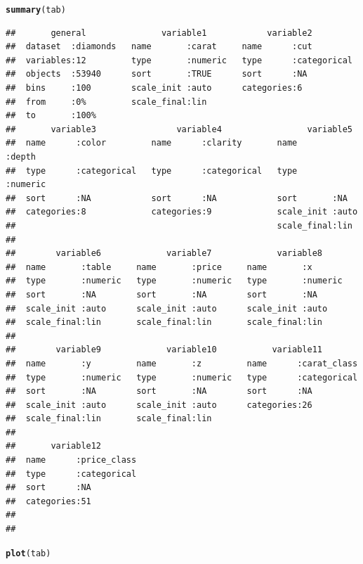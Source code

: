 \documentclass[11pt, fleqn, a4paper]{article}\usepackage{graphicx, color}
\makeatletter
\newcommand{\hlfunctioncall}[1]{\textcolor[rgb]{0.501960784313725,0,0.329411764705882}{\textbf{#1}}}%
\newenvironment{kframe}{%
 \def\at@end@of@kframe{}%
 \ifinner\ifhmode%
  \def\at@end@of@kframe{\end{minipage}}%
  \begin{minipage}{\columnwidth}%
 \fi\fi%
 \def\FrameCommand##1{\hskip\@totalleftmargin \hskip-\fboxsep
 \colorbox{shadecolor}{##1}\hskip-\fboxsep
     \hskip-\linewidth \hskip-\@totalleftmargin \hskip\columnwidth}%
 \MakeFramed {\advance\hsize-\width
   \@totalleftmargin\z@ \linewidth\hsize
   \@setminipage}}%
 {\par\unskip\endMakeFramed%
 \at@end@of@kframe}
\newenvironment{knitrout}{}{} %
\makeatother
\begin{document}
\begin{knitrout}\scriptsize
{}\color{fgcolor}\begin{kframe}
\begin{alltt}
\hlfunctioncall{summary}(tab)
\end{alltt}
\begin{verbatim}
##       general               variable1            variable2          
##  dataset  :diamonds   name       :carat     name      :cut          
##  variables:12         type       :numeric   type      :categorical  
##  objects  :53940      sort       :TRUE      sort      :NA           
##  bins     :100        scale_init :auto      categories:6            
##  from     :0%         scale_final:lin                               
##  to       :100%                                                     
##       variable3                variable4                 variable5      
##  name      :color         name      :clarity       name       :depth    
##  type      :categorical   type      :categorical   type       :numeric  
##  sort      :NA            sort      :NA            sort       :NA       
##  categories:8             categories:9             scale_init :auto     
##                                                    scale_final:lin      
##                                                                         
##        variable6             variable7             variable8      
##  name       :table     name       :price     name       :x        
##  type       :numeric   type       :numeric   type       :numeric  
##  sort       :NA        sort       :NA        sort       :NA       
##  scale_init :auto      scale_init :auto      scale_init :auto     
##  scale_final:lin       scale_final:lin       scale_final:lin      
##                                                                   
##        variable9             variable10           variable11         
##  name       :y         name       :z         name      :carat_class  
##  type       :numeric   type       :numeric   type      :categorical  
##  sort       :NA        sort       :NA        sort      :NA           
##  scale_init :auto      scale_init :auto      categories:26           
##  scale_final:lin       scale_final:lin                               
##                                                                      
##       variable12         
##  name      :price_class  
##  type      :categorical  
##  sort      :NA           
##  categories:51           
##                          
## 
\end{verbatim}
\begin{alltt}
\hlfunctioncall{plot}(tab)
\end{alltt}
\end{kframe}
\end{knitrout}
\end{document}
